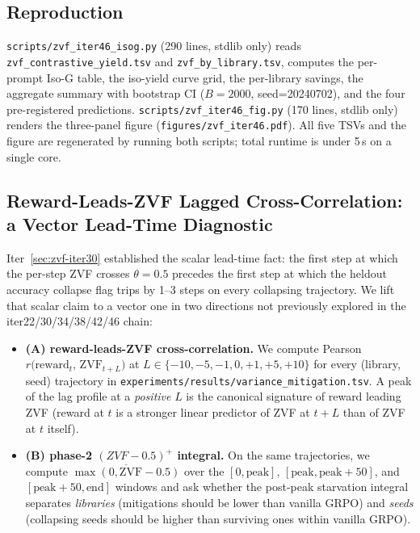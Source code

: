\documentclass{article}
\begin{document}
\subsection{Reproduction}
\label{sec:zvf-isog-repro}
\texttt{scripts/zvf_iter46_isog.py} (290 lines, stdlib only) reads
\texttt{zvf_contrastive_yield.tsv} and \texttt{zvf_by_library.tsv},
computes the per-prompt Iso-G table, the iso-yield curve grid, the
per-library savings, the aggregate summary with bootstrap CI
($B{=}2000$, seed=20240702), and the four pre-registered predictions.
\texttt{scripts/zvf_iter46_fig.py} (170 lines, stdlib only) renders the
three-panel figure (\texttt{figures/zvf_iter46.pdf}). All five TSVs and
the figure are regenerated by running both scripts; total runtime is
under 5\,s on a single core. 

\subsection{Reward-Leads-ZVF Lagged Cross-Correlation: a Vector Lead-Time Diagnostic}
\label{sec:zvf-lag}
Iter~\ref{sec:zvf-iter30} established the scalar lead-time fact: the
first step at which the per-step ZVF crosses $\theta{=}0.5$
precedes the first step at which the heldout accuracy collapse flag
trips by 1--3 steps on every collapsing trajectory. We lift that scalar
claim to a vector one in two directions not previously explored in the
iter22/30/34/38/42/46 chain:
\begin{itemize}
\item \textbf{(A) reward-leads-ZVF cross-correlation.} We compute
Pearson $r\bigl(\mathrm{reward}_t,\, \mathrm{ZVF}_{t+L}\bigr)$ at
$L \in \{-10,-5,-1,0,+1,+5,+10\}$ for every (library, seed)
trajectory in \texttt{experiments/results/variance_mitigation.tsv}. A
peak of the lag profile at a \emph{positive} $L$ is the canonical
signature of reward leading ZVF (reward at $t$ is a stronger linear
predictor of ZVF at $t+L$ than of ZVF at $t$ itself).
\item \textbf{(B) phase-2 $(ZVF{-}0.5)^+$ integral.} On the same
trajectories, we compute
$\overline{\max(0,\mathrm{ZVF}{-}0.5)}$ over the $[0,\text{peak}]$,
$[\text{peak},\text{peak}{+}50]$, and $[\text{peak}{+}50,\text{end}]$
windows and ask whether the post-peak starvation integral separates
\textit{libraries} (mitigations should be lower than vanilla GRPO)
and \textit{seeds} (collapsing seeds should be higher than surviving
ones within vanilla GRPO).
\end{itemize}
\end{document}

